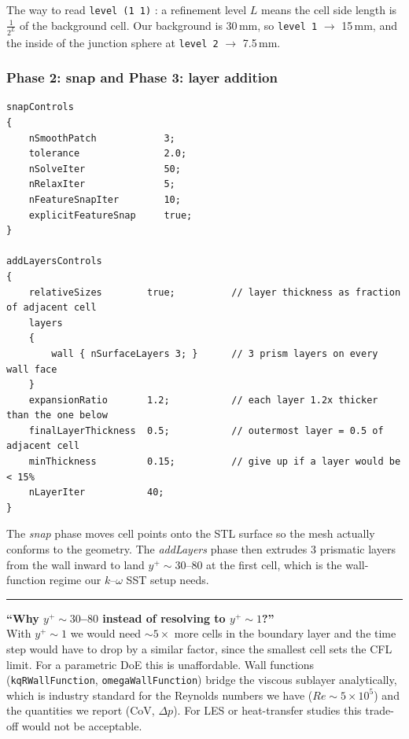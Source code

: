 \documentclass[11pt,a4paper]{article}
\newenvironment{vivabox}[1][]{%
    \par\medskip\noindent
    \begin{list}{}{%
        \setlength{\leftmargin}{1.4em}%
        \setlength{\rightmargin}{0pt}%
        \setlength{\topsep}{0pt}%
    }\item[]%
    \textcolor{orange!60!black}{\rule[-0.4em]{2.5pt}{1.0em}}%
    \hspace{0.6em}{\sffamily\bfseries\color{orange!50!black}#1}\par\smallskip
}{%
    \end{list}\medskip
}
\begin{document}
The way to read \texttt{level (1 1)} : a refinement level $L$ means
the cell side length is $\frac{1}{2^L}$ of the background cell. Our
background is 30\,mm, so \texttt{level 1} $\rightarrow$ 15\,mm, and the
inside of the junction sphere at \texttt{level 2} $\rightarrow$ 7.5\,mm.

\subsubsection{Phase 2: snap and Phase 3: layer addition}

\begin{lstlisting}[style=foamstyle]
snapControls
{
    nSmoothPatch            3;
    tolerance               2.0;
    nSolveIter              50;
    nRelaxIter              5;
    nFeatureSnapIter        10;
    explicitFeatureSnap     true;
}

addLayersControls
{
    relativeSizes        true;          // layer thickness as fraction of adjacent cell
    layers
    {
        wall { nSurfaceLayers 3; }      // 3 prism layers on every wall face
    }
    expansionRatio       1.2;           // each layer 1.2x thicker than the one below
    finalLayerThickness  0.5;           // outermost layer = 0.5 of adjacent cell
    minThickness         0.15;          // give up if a layer would be < 15%
    nLayerIter           40;
}
\end{lstlisting}

The \emph{snap} phase moves cell points onto the STL surface so the
mesh actually conforms to the geometry. The \emph{addLayers} phase
then extrudes 3 prismatic layers from the wall inward to land
$y^+\sim 30$--$80$ at the first cell, which is the wall-function
regime our $k$--$\omega$ SST setup needs.

\begin{vivabox}[Likely viva question]
\textbf{``Why $y^+\sim 30$--$80$ instead of resolving to $y^+\sim 1$?''}\\
With $y^+\sim 1$ we would need $\sim 5\times$ more cells in the
boundary layer and the time step would have to drop by a similar
factor, since the smallest cell sets the CFL limit. For a parametric
DoE this is unaffordable. Wall functions
(\texttt{kqRWallFunction}, \texttt{omegaWallFunction}) bridge the
viscous sublayer analytically, which is industry standard for the
Reynolds numbers we have ($Re\sim 5\times 10^5$) and the
quantities we report (CoV, $\Delta p$). For LES or
heat-transfer studies this trade-off would not be acceptable.
\end{vivabox}
\end{document}
